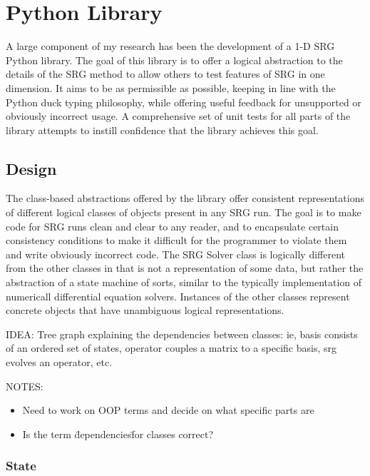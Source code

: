\chapter{Python Library}

A large component of my research has been the development of a 1-D SRG Python library. The goal of this library is to offer a logical abstraction to the details of the SRG method to allow others to test features of SRG in one dimension. It aims to be as permissible as possible, keeping in line with the Python duck typing philosophy, while offering useful feedback for unsupported or obviously incorrect usage. A comprehensive set of unit tests for all parts of the library attempts to instill confidence that the library achieves this goal.

\section{Design}

The class-based abstractions offered by the library offer consistent representations of different logical classes of objects present in any SRG run. The goal is to make code for SRG runs clean and clear to any reader, and to encapsulate certain consistency conditions to make it difficult for the programmer to violate them and write obviously incorrect code. The SRG Solver class is logically different from the other classes in that is not a representation of some data, but rather the abstraction of a state machine of sorts, similar to the typically implementation of numericall differential equation solvers. Instances of the other classes represent concrete objects that have unambiguous logical representations.

IDEA: Tree graph explaining the dependencies between classes: ie, basis consists of an ordered set of states, operator couples a matrix to a specific basis, srg evolves an operator, etc.

NOTES:

\begin{itemize}
    \item{Need to work on OOP terms and decide on what specific parts are}
    \item{Is the term \"dependencies\" for classes correct?}
\end{itemize}

\subsection{State}

